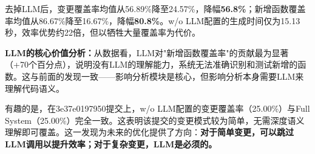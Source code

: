 \begin{table}[htbp]
    \centering
    \caption{组3消融实验：LLM能力影响对比}
    \label{tab:ablation-group3}
\end{table}

去掉LLM后，变更覆盖率均值从56.89\%降至24.57\%，降幅\textbf{56.8\%}；新增函数覆盖率均值从86.67\%降至16.67\%，降幅\textbf{80.8\%}。w/o LLM配置的生成时间仅为15.13秒，效率优势约22倍，但以牺牲大量覆盖率为代价。

\textbf{LLM的核心价值分析：}从数据看，LLM对"新增函数覆盖率"的贡献最为显著（+70个百分点），说明没有LLM的理解能力，系统无法准确识别和测试新增的函数。这与前面的发现一致——影响分析模块是核心，但影响分析本身需要LLM来理解代码语义。

有趣的是，在3e37e0197950提交上，w/o LLM配置的变更覆盖率（25.00\%）与Full System（25.00\%）完全一致。这表明该提交的变更模式较为简单，无需深度语义理解即可覆盖。这一发现为未来的优化提供了方向：\textbf{对于简单变更，可以跳过LLM调用以提升效率；对于复杂变更，LLM是必须的。}

